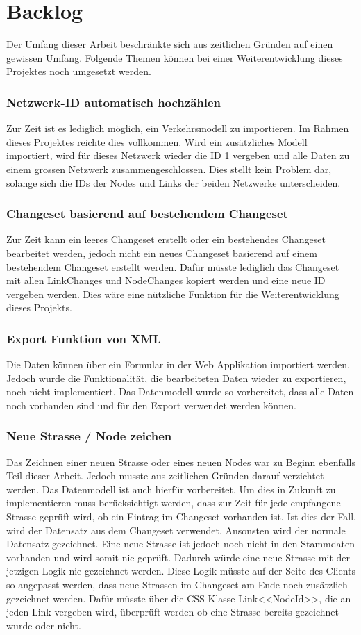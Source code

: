 \section{Backlog}
Der Umfang dieser Arbeit beschränkte sich aus zeitlichen Gründen auf einen gewissen Umfang. Folgende Themen können bei einer Weiterentwicklung dieses Projektes noch umgesetzt werden.
\subsubsection*{Netzwerk-ID automatisch hochzählen}
Zur Zeit ist es lediglich möglich, ein Verkehrsmodell zu importieren. Im Rahmen dieses Projektes reichte dies vollkommen. Wird ein zusätzliches Modell importiert, wird für dieses Netzwerk wieder die ID 1 vergeben und alle Daten zu einem grossen Netzwerk zusammengeschlossen. Dies stellt kein Problem dar, solange sich die IDs der Nodes und Links der beiden Netzwerke unterscheiden.
\subsubsection*{Changeset basierend auf bestehendem Changeset}
Zur Zeit kann ein leeres Changeset erstellt oder ein bestehendes Changeset bearbeitet werden, jedoch nicht ein neues Changeset basierend auf einem bestehendem Changeset erstellt werden. Dafür müsste lediglich das Changeset mit allen Link\textunderscore Changes und Node\textunderscore Changes kopiert werden und eine neue ID vergeben werden. Dies wäre eine nützliche Funktion für die Weiterentwicklung dieses Projekts.
\subsubsection*{Export Funktion von XML}
Die Daten können über ein Formular in der Web Applikation importiert werden. Jedoch wurde die Funktionalität, die bearbeiteten Daten wieder zu exportieren, noch nicht implementiert. Das Datenmodell wurde so vorbereitet, dass alle Daten noch vorhanden sind und für den Export verwendet werden können.
\subsubsection*{Neue Strasse / Node zeichen}
Das Zeichnen einer neuen Strasse oder eines neuen Nodes war zu Beginn ebenfalls Teil dieser Arbeit. Jedoch musste aus zeitlichen Gründen darauf verzichtet werden. Das Datenmodell ist auch hierfür vorbereitet. Um dies in Zukunft zu implementieren muss berücksichtigt werden, dass zur Zeit für jede empfangene Strasse geprüft wird, ob ein Eintrag im Changeset vorhanden ist. Ist dies der Fall, wird der Datensatz aus dem Changeset verwendet. Ansonsten wird der normale Datensatz gezeichnet. Eine neue Strasse ist jedoch noch nicht in den Stammdaten vorhanden und wird somit nie geprüft. Dadurch würde eine neue Strasse mit der jetzigen Logik nie gezeichnet werden. Diese Logik müsste auf der Seite des Clients so angepasst werden, dass neue Strassen im Changeset am Ende noch zusätzlich gezeichnet werden. Dafür müsste über die CSS Klasse \glqq{}Link\textunderscore <<NodeId>>\grqq{}, die an jeden Link vergeben wird,  überprüft werden ob eine Strasse bereits gezeichnet wurde oder nicht.
